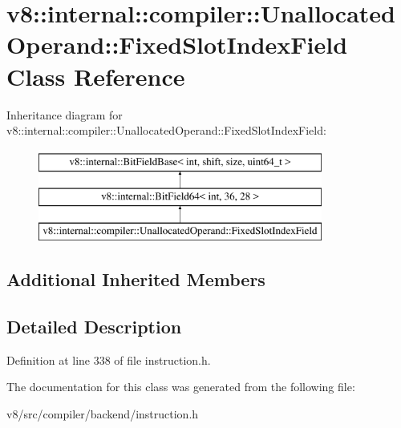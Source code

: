 \hypertarget{classv8_1_1internal_1_1compiler_1_1UnallocatedOperand_1_1FixedSlotIndexField}{}\section{v8\+:\+:internal\+:\+:compiler\+:\+:Unallocated\+Operand\+:\+:Fixed\+Slot\+Index\+Field Class Reference}
\label{classv8_1_1internal_1_1compiler_1_1UnallocatedOperand_1_1FixedSlotIndexField}
Inheritance diagram for v8\+:\+:internal\+:\+:compiler\+:\+:Unallocated\+Operand\+:\+:Fixed\+Slot\+Index\+Field\+:\begin{figure}[H]
\begin{center}
\leavevmode
\includegraphics[height=3.000000cm]{classv8_1_1internal_1_1compiler_1_1UnallocatedOperand_1_1FixedSlotIndexField}
\end{center}
\end{figure}
\subsection*{Additional Inherited Members}


\subsection{Detailed Description}


Definition at line 338 of file instruction.\+h.



The documentation for this class was generated from the following file\+:\begin{DoxyCompactItemize}
\item 
v8/src/compiler/backend/instruction.\+h\end{DoxyCompactItemize}
